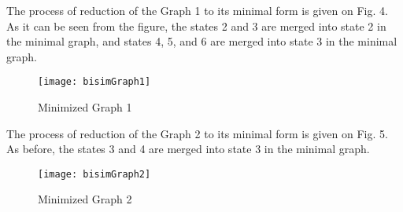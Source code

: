 The process of reduction of the Graph 1 to its minimal form is given on Fig. 4. As it can be seen from the figure, the states 
2 and 3 are merged into state 2 in the minimal graph, and states 4, 5, and 6 are merged into state 3 in the minimal graph.
\begin{figure}[h!]
\centering
\texttt{[image: bisimGraph1]}
\caption{Minimized Graph 1}
\label{fig:bisimGraph1}
\end{figure}

The process of reduction of the Graph 2 to its minimal form is given on Fig. 5. As before, the states 
3 and 4 are merged into state 3 in the minimal graph.
\begin{figure}[h!]
\centering
\texttt{[image: bisimGraph2]}
\caption{Minimized Graph 2}
\label{fig:bisimGraph2}
\end{figure}

